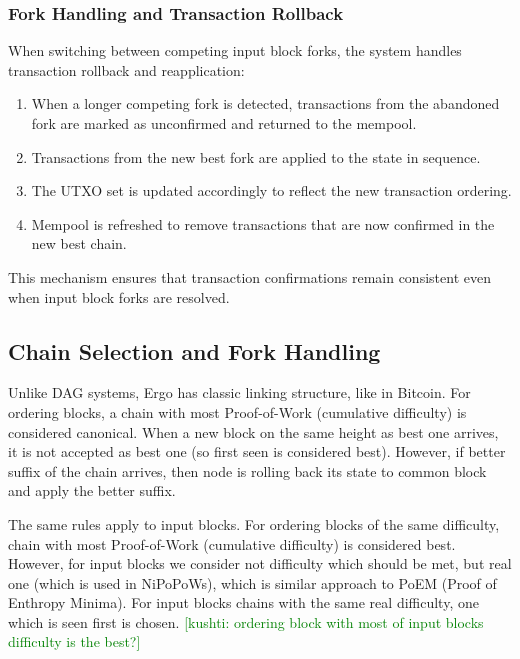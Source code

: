 \documentclass{llncs}
\newcommand{\knote}[1]{{\textcolor{green}{[kushti: #1]}}}
\begin{document}
\subsubsection{Fork Handling and Transaction Rollback}
\label{subsubsec:fork-handling-transactions}

When switching between competing input block forks, the system handles transaction rollback and reapplication:

\begin{enumerate}
\item When a longer competing fork is detected, transactions from the abandoned fork are marked as unconfirmed and returned to the mempool.
\item Transactions from the new best fork are applied to the state in sequence.
\item The UTXO set is updated accordingly to reflect the new transaction ordering.
\item Mempool is refreshed to remove transactions that are now confirmed in the new best chain.
\end{enumerate}

This mechanism ensures that transaction confirmations remain consistent even when input block forks are resolved.

\subsection{Chain Selection and Fork Handling}
\label{subsec:chain-selection}

Unlike DAG systems, Ergo has classic linking structure, like in Bitcoin. For ordering blocks, a chain with most
Proof-of-Work (cumulative difficulty) is considered canonical. When a new block on the same height as best one
arrives, it is not accepted as best one (so first seen is considered best). However, if better suffix of the chain
arrives, then node is rolling back its state to common block and apply the better suffix.

The same rules apply to input blocks. For ordering blocks of the same difficulty, chain with most Proof-of-Work
(cumulative difficulty) is considered best. However, for input blocks we consider not difficulty which should be met,
 but real one (which is used in NiPoPoWs), which is similar approach to PoEM (Proof of Enthropy Minima).
 For input blocks chains with the same real difficulty, one which is seen first is chosen.
 \knote{ordering block with most of input blocks difficulty is the best?}
\end{document}

